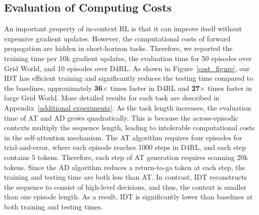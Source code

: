 \documentclass{article}
\theoremstyle{plain}
\theoremstyle{definition}
\theoremstyle{remark}
\begin{document}
\subsection{Evaluation of Computing Costs}
An important property of in-context RL is that it can improve itself without expensive gradient updates. However, the computational costs of forward propagation are hidden in short-horizon tasks. Therefore, we reported the training time per 10k gradient updates, the evaluation time for 50 episodes over Grid World, and 10 episodes over D4RL. As shown in Figure~\ref{cost_figure}, our IDT has efficient training and significantly reduces the testing time compared to the baselines, approximately \textbf{36$\bm\times$} times faster in D4RL and \textbf{27$\bm\times$} times faster in large Grid World. More detailed results for each task are described in Appendix~\ref{additional experiments}.
As the task length increases, the evaluation time of AT and AD grows quadratically.
This is because the across-episodic contexts multiply the sequence length, leading to intolerable computational costs in the self-attention mechanism. The AT algorithm requires four episodes for trial-and-error, where each episode reaches 1000 steps in D4RL, and each step contains 5 tokens.
Therefore, each step of AT generation requires scanning 20k tokens.
Since the AD algorithm reduces a return-to-go token at each step, the training and testing time are both less than AT.
In contrast, IDT reconstructs the sequence to consist of high-level decisions, and thus, the context is smaller than one episode length. As a result, IDT is significantly lower than baselines at both training and testing times.
\end{document}
